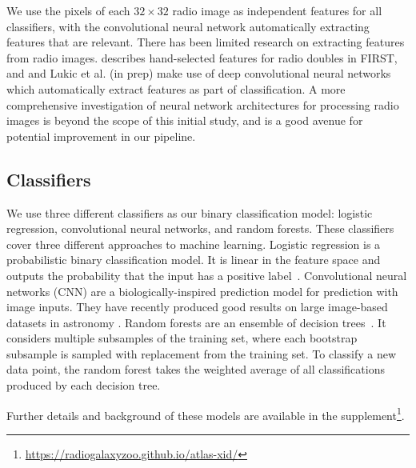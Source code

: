 \documentclass[fleqn,usenatbib,usedcolumn]{mnras}
\begin{document}
    We use the pixels of each $32 \times 32$ radio image as independent
    features for all classifiers, with the convolutional neural network
    automatically extracting
    features that are relevant. There has been limited research on extracting
    features from radio images. \citet{proctor06} describes hand-selected
    features for radio doubles in FIRST, and \citet{aniyan17cnn} and
    Lukic et al. (in prep) make use of deep convolutional neural networks
    which automatically extract features as part of classification. A more
    comprehensive investigation of neural network architectures for processing
    radio images is beyond the scope of this initial study, and is a good
    avenue for potential improvement in our pipeline.

  \subsection{Classifiers}\label{sec:classifiers}

    We use three different classifiers as our binary classification model:
    logistic regression, convolutional neural networks, and random forests.
    These classifiers cover three different approaches to machine learning.
    Logistic regression is a probabilistic binary classification model.
    It is linear in the
    feature space and outputs the probability that the input has a positive
    label~\citep[Chap. 4]{bishop06ml}.
    Convolutional neural networks (CNN) are a biologically-inspired
    prediction model for prediction with image inputs.
    They have recently produced good results on large image-based datasets
    in astronomy \citep[e.g.][; Lukic et al. in prep]{dieleman15cnn}.
    Random forests are an ensemble of decision
    trees~\citep{breiman01random-forest}. It considers multiple subsamples
    of the training set, where each bootstrap subsample is sampled with
    replacement from the training set. To classify a new data
    point, the random forest takes the weighted average of all
    classifications produced by each decision tree.

    Further details and background of these models are available in the
    supplement\footnote{\url{https://radiogalaxyzoo.github.io/atlas-xid/}}.
\end{document}
